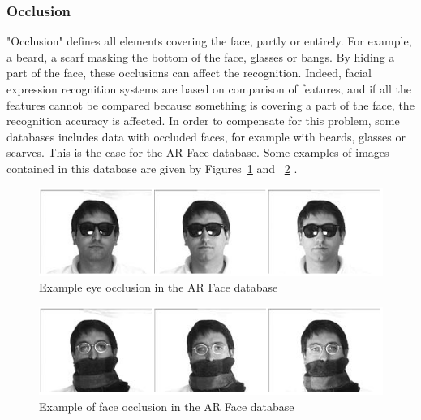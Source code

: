 \subsubsection{Occlusion}

\vspace{\baselineskip}
\noindent "Occlusion" defines all elements covering the face, partly or entirely. For example, a beard, a scarf masking the bottom of the face, glasses or bangs. By hiding a part of the face, these occlusions can affect the recognition. Indeed, facial expression recognition systems are based on comparison of features, and if all the features cannot be compared because something is covering a part of the face, the recognition accuracy is affected. In order to compensate for this problem, some databases includes data with occluded faces, for example with beards, glasses or scarves. This is the case for the AR Face database. Some examples of images contained in this database are given by Figures~\ref{arface_example2} and ~\ref{arface_example3} \cite{ARFACE}.
\newline

\begin{figure}[!h]
\begin{center}
\noindent \includegraphics[scale=0.7]{figures/arface_example2} 
\newline
\caption{Example eye occlusion in the AR Face database}
\label{arface_example2}
\end{center} 
\end{figure}

\begin{figure}[!h]
\begin{center}
\noindent \includegraphics[scale=0.7]{figures/arface_example3} 
\newline
\caption{Example of face occlusion in the AR Face database}
\label{arface_example3}
\end{center} 
\end{figure} 

